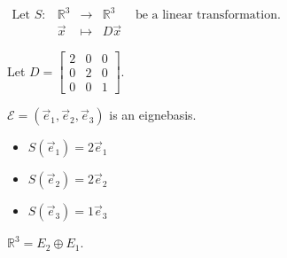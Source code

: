 \documentclass[11pt,fleqn]{book} %
\begin{document}
\begin{example}
{~~~}

    $\begin{matrix} \text{Let }S: &\mathbb{R}^3 &\to &\mathbb{R}^3 &\text{ be a linear transformation. }\\ &\vec{x} &\mapsto &D\vec{x} \end{matrix}$

    Let $D = \begin{bmatrix} 2 &0 &0 \\ 0 &2 &0 \\ 0 &0 &1 \end{bmatrix}$.

    $\mathcal{E} = (\vec{e}_1, \vec{e}_2, \vec{e}_3)$ is an eignebasis.
    \begin{itemize}
        \item $S(\vec{e}_1) = 2\vec{e}_1$
        \item $S(\vec{e}_2) = 2\vec{e}_2$
        \item $S(\vec{e}_3) = 1\vec{e}_3$
    \end{itemize}

    $\mathbb{R}^3 = E_2 \oplus E_1$.
\end{example}
\end{document}
